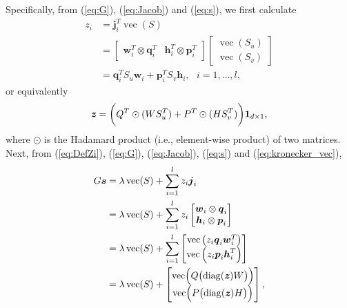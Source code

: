 \documentclass[11pt,twoside]{article}
\newcommand{\bsym}[1]{\ensuremath{\boldsymbol{#1}}}
\newcommand{\bw}{\ensuremath{\bsym{w}}}
\newcommand{\bj}{\ensuremath{\bsym{j}}}
\newcommand{\bp}{\ensuremath{\bsym{p}}}
\newcommand{\bq}{\ensuremath{\bsym{q}}}
\newcommand{\bh}{\ensuremath{\bsym{h}}}
\newcommand{\bs}{\ensuremath{\bsym{s}}}
\DeclareMathOperator*{\diag}{diag}
\DeclareMathOperator*{\vectorize}{vec}
\begin{document}
Specifically, from (\ref{eq:G}), (\ref{eq:Jacob}) and (\ref{eq:s}), we first calculate
\begin{equation}
\begin{aligned}
    z_i&= \bj_i^T \vectorize(S)\\
    &=\begin{bmatrix} \bw_i^T\otimes\bq_i^T & \bh_i^T\otimes\bp_i^T \end{bmatrix}\begin{bmatrix}\vectorize(S_u)\\ \vectorize(S_v)\end{bmatrix}\\
    &=\bq_i^T S_u \bw_i + \bp_i^T S_v \bh_i, \text{ }i=1,\dots,l
    \label{eq:DefZi},
\end{aligned}
\end{equation}
or equivalently
\begin{equation}
    \textbf{\textit{z}} = \biggl({Q^T}\odot{(WS_u^T)}+{P^T}\odot{(HS_v^T)}\biggr) \bsym{1}_{d\times 1}
    \label{eq:CalcZ},
\end{equation}
where $\odot$ is the Hadamard product (i.e., element-wise product) of two matrices.  Next, from (\ref{eq:DefZi}), (\ref{eq:G}), (\ref{eq:Jacob}), (\ref{eq:s}) and  (\ref{eq:kronecker_vec}),
\begin{align}
    G \bs         &= \lambda \vectorize(S) + \sum_{i=1}^l z_i \bj_i \\
                  &= \lambda \vectorize(S) + \sum_{i=1}^l z_i \begin{bmatrix} \bw_i\otimes \bq_i \\ \bh_i\otimes \bp_i \end{bmatrix} \nonumber \\
                  &= \lambda \vectorize(S) +  \sum_{i=1}^l \begin{bmatrix}\vectorize\left(z_i \bq_i \bw_i^T\right) \\ \vectorize\left(z_i \bp_i \bh_i^T\right)\end{bmatrix} \nonumber  \\
                  &= \lambda \vectorize(S) +  \begin{bmatrix}\vectorize \Bigl ( Q \bigl(\diag(\textbf{\textit{z}}) W \bigr) \Bigr)\\\vectorize \Bigl ( P \bigl ( \diag(\textbf{\textit{z}}) H \bigr) \Bigr)\end{bmatrix} \label{eq:Hv},
\end{align}
\end{document}
